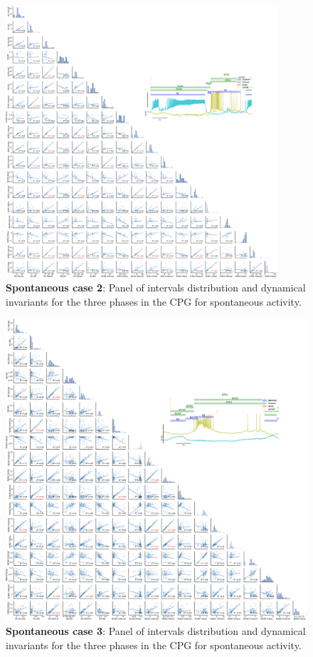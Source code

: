 \begin{figure}[htbp]
	\centering
	\includegraphics[width=0.9\textwidth]{./img/invariants/data/SUSSEX/prep3/images/3phases/panel_with_pairplot.pdf}
	\caption{\textbf{Spontaneous case 2}: Panel of intervals distribution and dynamical invariants for the three phases in the CPG for spontaneous activity.}
	\label{fig:prep3 invariants pairplot}
\end{figure}


\begin{figure}[htbp]
	\centering
	\includegraphics[width=\textwidth]{./img/invariants/data/SUSSEX/prep1/images/3phases/panel_with_pairplot.pdf}
	\caption{\textbf{Spontaneous case 3}: Panel of intervals distribution and dynamical invariants for the three phases in the CPG for spontaneous activity.}
	\label{fig:prep1 invariants pairplot}
\end{figure}

